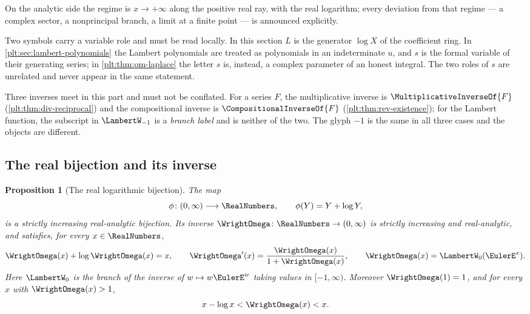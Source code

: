 \documentclass[11pt,oneside]{article}
\theoremstyle{plain}
\newtheorem{proposition}[theorem]{Proposition}
\theoremstyle{definition}
\theoremstyle{remark}
\newcommand{\rev}[1]{\CompositionalInverseOf{#1}}
\newcommand{\recip}[1]{\MultiplicativeInverseOf{#1}}
\begin{document}
On the analytic side the regime is \(x\to+\infty\) along the positive real
ray, with the real logarithm; every deviation from that regime --- a complex
sector, a nonprincipal branch, a limit at a finite point --- is announced
explicitly.

Two symbols carry a variable role and must be read locally.  In this section
\(L\) is the generator \(\log X\) of the coefficient ring.  In
\cref{plt:sec:lambert-polynomials} the Lambert polynomials are treated as
polynomials in an indeterminate \(u\), and \(s\) is the formal variable of
their generating series; in \cref{plt:thm:om-laplace} the letter \(s\) is,
instead, a complex parameter of an honest integral.  The two roles of \(s\)
are unrelated and never appear in the same statement.

\begin{warningbox}
Three inverses meet in this part and must not be conflated.  For a series
\(F\), the multiplicative inverse is \(\recip{F}\) (\cref{plt:thm:div-reciprocal})
and the compositional inverse is \(\rev{F}\) (\cref{plt:thm:rev-existence});
for the Lambert function, the subscript in \(\LambertW_{-1}\) is a
\emph{branch label} and is neither of the two.  The glyph \(-1\) is the same
in all three cases and the objects are different.
\end{warningbox}

\subsection{The real bijection and its inverse}
\label{plt:sec:om-real}

\begin{proposition}[The real logarithmic bijection]
\label{plt:prop:om-real-bijection}
The map
\[
 \phi\colon(0,\infty)\longrightarrow\RealNumbers,
 \qquad
 \phi(Y)=Y+\log Y,
\]
is a strictly increasing real-analytic bijection.  Its inverse
\(\WrightOmega\colon\RealNumbers\to(0,\infty)\) is strictly increasing and
real-analytic, and satisfies, for every \(x\in\RealNumbers\),
\begin{equation}\label{plt:eq:om-defining}
 \WrightOmega(x)+\log\WrightOmega(x)=x,
 \qquad
 \WrightOmega'(x)=\frac{\WrightOmega(x)}{1+\WrightOmega(x)},
 \qquad
 \WrightOmega(x)=\LambertW_0(\EulerE^{x}).
\end{equation}
Here \(\LambertW_0\) is the branch of the inverse of \(w\mapsto w\EulerE^{w}\)
taking values in \([-1,\infty)\).  Moreover \(\WrightOmega(1)=1\), and for
every \(x\) with \(\WrightOmega(x)>1\),
\begin{equation}\label{plt:eq:om-envelope}
 x-\log x<\WrightOmega(x)<x.
\end{equation}
\end{proposition}
\end{document}
